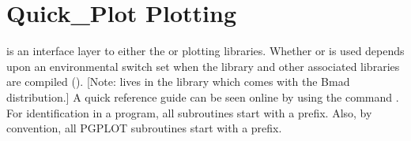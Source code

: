 \chapter{Quick_Plot Plotting}
\label{c:quick.plot}

\quickplot is an interface layer to either the \cite{b:pgplot} or
\cite{b:plplot} plotting libraries. Whether  or  is used depends upon
an environmental switch set when the \bmad library and other associated libraries are compiled
(). [Note: \quickplot lives in the  library which comes with the Bmad
distribution.] A quick reference guide can be seen online by using the command . For identification in a program, all \quickplot subroutines start with a 
prefix. Also, by convention, all PGPLOT subroutines start with a  prefix.


